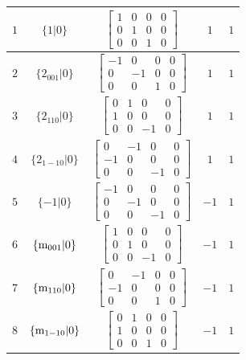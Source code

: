 \documentclass[fleqn,8pt]{jsarticle}
\begin{document}
\begin{longtable}{ccccc}
$ 1 $ & $ \{1|0\} $ & $ \begin{bmatrix} 1 & 0 & 0 & 0 \\ 0 & 1 & 0 & 0 \\ 0 & 0 & 1 & 0 \end{bmatrix} $ & $ 1 $ & $ 1 $ \\ \hline
$ 2 $ & $ \{2{}_{001}|0\} $ & $ \begin{bmatrix} -1 & 0 & 0 & 0 \\ 0 & -1 & 0 & 0 \\ 0 & 0 & 1 & 0 \end{bmatrix} $ & $ 1 $ & $ 1 $ \\ \hline
$ 3 $ & $ \{2{}_{110}|0\} $ & $ \begin{bmatrix} 0 & 1 & 0 & 0 \\ 1 & 0 & 0 & 0 \\ 0 & 0 & -1 & 0 \end{bmatrix} $ & $ 1 $ & $ 1 $ \\ \hline
$ 4 $ & $ \{2{}_{1-10}|0\} $ & $ \begin{bmatrix} 0 & -1 & 0 & 0 \\ -1 & 0 & 0 & 0 \\ 0 & 0 & -1 & 0 \end{bmatrix} $ & $ 1 $ & $ 1 $ \\ \hline
$ 5 $ & $ \{-1|0\} $ & $ \begin{bmatrix} -1 & 0 & 0 & 0 \\ 0 & -1 & 0 & 0 \\ 0 & 0 & -1 & 0 \end{bmatrix} $ & $ -1 $ & $ 1 $ \\ \hline
$ 6 $ & $ \{{\rm m}_{001}|0\} $ & $ \begin{bmatrix} 1 & 0 & 0 & 0 \\ 0 & 1 & 0 & 0 \\ 0 & 0 & -1 & 0 \end{bmatrix} $ & $ -1 $ & $ 1 $ \\ \hline
$ 7 $ & $ \{{\rm m}_{110}|0\} $ & $ \begin{bmatrix} 0 & -1 & 0 & 0 \\ -1 & 0 & 0 & 0 \\ 0 & 0 & 1 & 0 \end{bmatrix} $ & $ -1 $ & $ 1 $ \\ \hline
$ 8 $ & $ \{{\rm m}_{1-10}|0\} $ & $ \begin{bmatrix} 0 & 1 & 0 & 0 \\ 1 & 0 & 0 & 0 \\ 0 & 0 & 1 & 0 \end{bmatrix} $ & $ -1 $ & $ 1 $ \\ \hline

\end{longtable}
\end{document}
